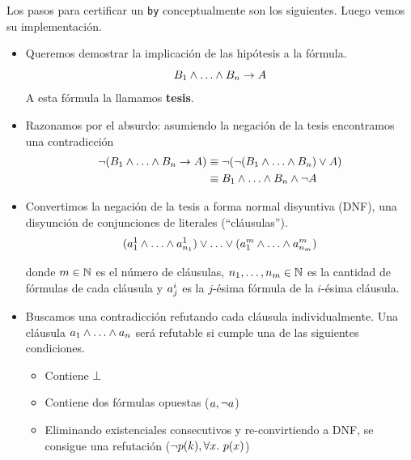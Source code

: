 Los pasos para certificar un \lstinline{by} conceptualmente son los siguientes. Luego vemos su implementación.
\begin{itemize}
    \item Queremos demostrar la implicación de las hipótesis a la fórmula.
    \[
        \formTwo_1 \fAnd \dots \fAnd \formTwo_n \fImp \form
    \]
    A esta fórmula la llamamos \textbf{tesis}.
    \item Razonamos por el absurdo: asumiendo la negación de la tesis encontramos una contradicción
    \begin{align*}
        \fNot (\formTwo_1 \fAnd \dots \fAnd \formTwo_n \fImp \form)
        &\equiv \fNot (\fNot (\formTwo_1 \fAnd \dots \fAnd \formTwo_n) \fOr \form)\\
        &\equiv \formTwo_1 \fAnd \dots \fAnd \formTwo_n \fAnd \fNot \form
    \end{align*}
    \item Convertimos la negación de la tesis a forma normal disyuntiva (DNF),
    una disyunción de conjunciones de literales (``cláusulas'').
    \[
        (\formLit^1_{1} \fAnd \dots \fAnd \formLit^1_{n_1})
        \fOr \dots \fOr
        (\formLit^m_{1} \fAnd \dots \fAnd \formLit^m_{n_m})
    \]

    donde $m \in \mathbb{N}$ es el número de cláusulas, $n_1, \dots, n_m \in
    \mathbb{N}$ es la cantidad de fórmulas de cada cláusula y $a^i_j$
    es la $j$-ésima fórmula de la $i$-ésima cláusula.

    \item Buscamos una contradicción refutando cada cláusula individualmente.
    Una cláusula $\formLit_1 \fAnd \dots \fAnd \formLit_n$ será refutable si
    cumple una de las siguientes condiciones.
    \begin{itemize}
        \item Contiene $\bot$
        \item Contiene dos fórmulas opuestas ($a, \neg a$)
        \item Eliminando existenciales consecutivos y re-convirtiendo a DNF, se
        consigue una refutación ($\neg p(k), \forall x .\ p(x)$)
    \end{itemize}
\end{itemize}

